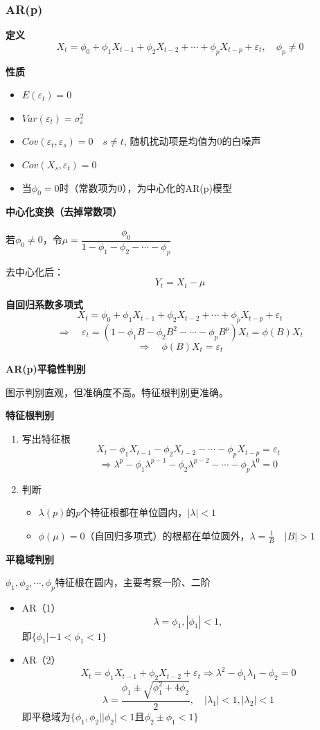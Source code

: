 \documentclass{article} %
\begin{document}
\subsubsection{AR(p)}

\textbf{定义}
\[
X_t=\phi_0+\phi_1X_{t-1}+\phi_2X_{t-2}+\cdots+\phi_pX_{t-p}+\varepsilon_t, \quad \phi_p\not=0
\]

\textbf{性质}
\begin{itemize}
\item $E(\varepsilon_t)=0$
\item $Var(\varepsilon_t)=\sigma_{\varepsilon}^2$
\item $Cov(\varepsilon_t,\varepsilon_s)=0\quad s\not =t$, 随机扰动项是均值为0的白噪声
\item $Cov(X_s,\varepsilon_t)=0$
\item 当$\phi_0=0$时（常数项为0），为中心化的AR(p)模型
\end{itemize}

\textbf{中心化变换（去掉常数项）}

若$\phi_0\not =0$，令$\mu=\dfrac{\phi_0}{1-\phi_1-\phi_2-\cdots-\phi_p}$

去中心化后：
\[
Y_t=X_t-\mu
\]

\textbf{自回归系数多项式}
\[
X_t=\phi_0+\phi_1X_{t-1}+\phi_2X_{t-2}+\cdots+\phi_pX_{t-p}+\varepsilon_t
\]
\[
\Rightarrow \quad \varepsilon_t=(1-\phi_1B-\phi_2B^2-\cdots-\phi_pB^p)X_t=\phi(B)X_t
\]
\[
\Rightarrow \quad \phi(B)X_t=\varepsilon_t
\]

\textbf{AR(p)平稳性判别}

图示判别直观，但准确度不高。特征根判别更准确。

\textbf{特征根判别}

\begin{enumerate}
\item 写出特征根
\[
X_t-\phi_1X_{t-1}-\phi_2X_{t-2}-\cdots-\phi_pX_{t-p}=\varepsilon_t
\]
\[
\Rightarrow \lambda^p-\phi_1\lambda^{p-1}-\phi_2\lambda^{p-2}-\cdots-\phi_p\lambda^0=0
\]
\item 判断
\begin{itemize}
\item $\lambda(p)$的$p$个特征根都在单位圆内，$|\lambda|<1$
\item $\phi(\mu)=0$（自回归多项式）的根都在单位圆外，$\lambda=\frac{1}{B}\quad |B|>1$
\end{itemize}
\end{enumerate}

\textbf{平稳域判别}

$\phi_1,\phi_2,\cdots,\phi_p$特征根在圆内，主要考察一阶、二阶
\begin{itemize}
\item AR（1）
\[
\lambda=\phi_1,|\phi_1|<1,
\]
即$\{\phi_1|-1<\phi_1<1\}$
\item AR（2）
\[
X_t=\phi_1X_{t-1}+\phi_2X_{t-2}+\varepsilon_t\Rightarrow\lambda^2-\phi_1\lambda_1-\phi_2=0
\]
\[
\lambda=\dfrac{\phi_{1}\pm\sqrt{\phi_{1}^{2}+4\phi_{2}}}{2},\quad |\lambda_{1}|<1,|\lambda_{2}|<1
\]
即平稳域为$\{\phi_1,\phi_2||\phi_2|<1且\phi_2\pm\phi_1<1\}$
\end{itemize}
\end{document}
